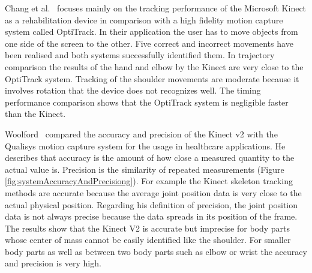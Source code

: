 Chang et al.~\cite{Chang2012-hz} focuses mainly on the tracking performance of the Microsoft Kinect as a rehabilitation device in comparison with a high fidelity motion capture system called OptiTrack. In their application the user has to move objects from one side of the screen to the other. Five correct and incorrect movements have been realised and both systems successfully identified them. In trajectory comparison the results of the hand and elbow by the Kinect are very close to the OptiTrack system. Tracking of the shoulder movements are moderate because it involves rotation that the device does not recognizes well. The timing performance comparison shows that the OptiTrack system is negligible faster than the Kinect.

Woolford~\cite{Woolford2015-ub} compared the accuracy and precision of the Kinect v2 with the Qualisys motion capture system for the usage in healthcare applications. He describes that accuracy is the amount of how close a measured quantity to the actual value is. Precision is the similarity of repeated measurements (Figure \ref{fig:systemAccuracyAndPrecisiong}). For example the Kinect skeleton tracking methods are accurate because the average joint position data is very close to the actual physical position. Regarding his definition of precision, the joint position data is not always precise because the data spreads in its position of the frame. The results show that the Kinect V2 is accurate but imprecise for body parts whose center of mass cannot be easily identified like the shoulder. For smaller body parts as well as between two body parts such as elbow or wrist the accuracy and precision is very high. 

